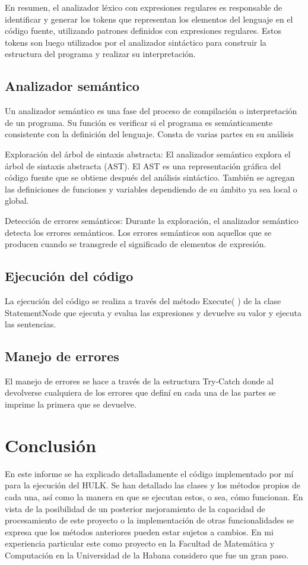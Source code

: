 \documentclass[a4paper,12pt]{article}
\begin{document}
En resumen, el analizador léxico con expresiones regulares es responsable de identificar y generar los tokens que representan los elementos del lenguaje en el código fuente, utilizando patrones definidos con expresiones regulares. Estos tokens son luego utilizados por el analizador sintáctico para construir la estructura del programa y realizar su interpretación.


\subsection{Analizador semántico}

Un analizador semántico es una fase del proceso de compilación o interpretación de un programa. Su función es verificar si el programa es semánticamente consistente con la definición del lenguaje. Consta de varias partes en su análisis

Exploración del árbol de sintaxis abstracta: El analizador semántico explora el árbol de sintaxis abstracta (AST). El AST es una representación gráfica del código fuente que se obtiene después del análisis sintáctico. También se agregan las definiciones de funciones y variables dependiendo de su ámbito ya sea local o global.

Detección de errores semánticos: Durante la exploración, el analizador semántico detecta los errores semánticos. Los errores semánticos son aquellos que se producen cuando se transgrede el significado de elementos de expresión.

\subsection{Ejecución del código}

La ejecución del código se realiza a través del método Execute( ) de la clase StatementNode que ejecuta y evalua las expresiones y devuelve su valor y ejecuta las sentencias. 

\subsection{Manejo de errores}

El manejo de errores se hace a través de la estructura Try-Catch donde al devolverse cualquiera de los errores que definí en cada una de las partes se imprime la primera que se devuelve.

\section{Conclusión}\label{sec:conclu}

En este informe se ha explicado detalladamente el código implementado por mí para la ejecución del HULK. Se han detallado las clases y los métodos propios de cada una, así como la manera en que se ejecutan estos, o sea, cómo funcionan. En vista de la posibilidad de un posterior mejoramiento de la capacidad de procesamiento de este proyecto o la implementación de otras funcionalidades se expresa que los métodos anteriores pueden estar sujetos a cambios. En mi experiencia particular este como proyecto en la Facultad de Matemática y Computación en la Universidad de la Habana considero que fue un gran paso.
\end{document}
